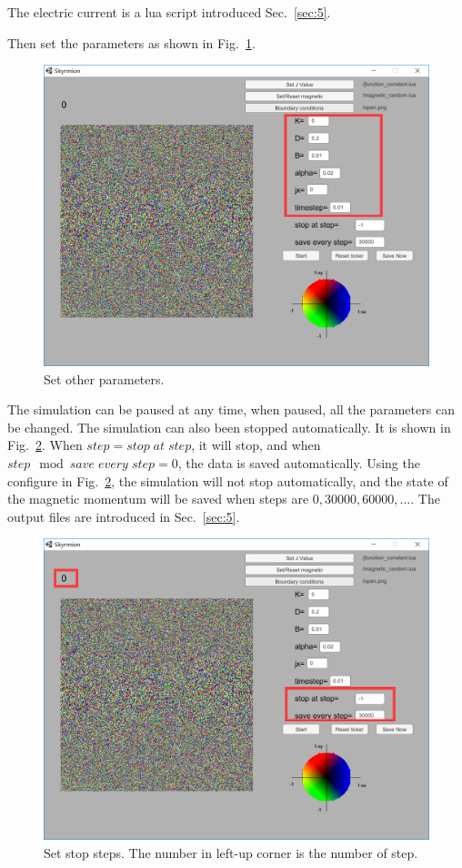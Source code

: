 \documentclass[aps,superscriptaddress,groupedaddress]{revtex4}  %
\begin{document}
The electric current is a lua script introduced Sec.~\ref{sec:5}.

Then set the parameters as shown in Fig.~\ref{Fig:intro2}.
\begin{figure}
\includegraphics[scale=0.3]{intro2.png}
\caption{\label{Fig:intro2}Set other parameters.}
\end{figure}

The simulation can be paused at any time, when paused, all the parameters can be changed. The simulation can also been stopped automatically. It is shown in Fig.~\ref{Fig:intro3}. When $step = stop\;at\;step$, it will stop, and when $step \mod save\;every\;step=0$, the data is saved automatically. Using the configure in Fig.~\ref{Fig:intro3}, the simulation will not stop automatically, and the state of the magnetic momentum will be saved when steps are $0,30000,60000,\ldots$. The output files are introduced in Sec.~\ref{sec:5}.
\begin{figure}
\includegraphics[scale=0.3]{intro3.png}
\caption{\label{Fig:intro3}Set stop steps. The number in left-up corner is the number of step.}
\end{figure}
\end{document}
